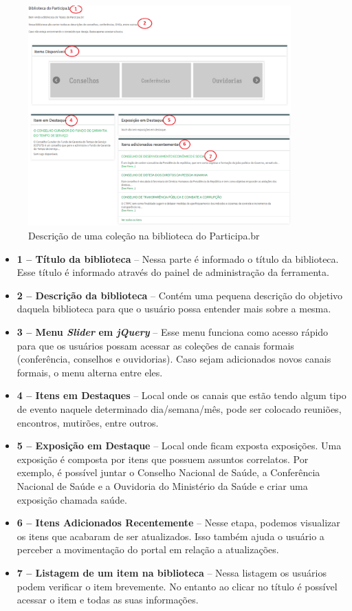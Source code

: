 \graphicspath{{figuras/prototipo/}}
\begin{figure}[H]
\centering
\includegraphics[width=0.9\textwidth]{pagina-inicial}
\caption{Descrição de uma coleção na biblioteca do Participa.br}
\label{fig:inicial_prototipo}
\end{figure}

\begin{itemize}
	\item \textbf{1 – Título da biblioteca} – Nessa parte é informado o título da biblioteca. Esse título é informado através do painel de administração da ferramenta.
	\item \textbf{2 – Descrição da biblioteca} – Contém uma pequena descrição do objetivo daquela biblioteca para que o usuário possa entender mais sobre a mesma.
	\item \textbf{3 – Menu \textit{Slider} em \textit{jQuery}} – Esse menu funciona como acesso rápido para que os usuários possam acessar as coleções de canais formais (conferência, conselhos e ouvidorias). Caso sejam adicionados novos canais formais, o menu alterna entre eles.
	\item \textbf{4 – Itens em Destaques} – Local onde os canais que estão tendo algum tipo de evento naquele determinado dia/semana/mês, pode ser colocado reuniões, encontros, mutirões, entre outros.
	\item \textbf{5 – Exposição em Destaque} – Local onde ficam exposta exposições. Uma exposição é composta por itens que possuem assuntos correlatos. Por exemplo, é possível juntar o Conselho Nacional de Saúde, a Conferência Nacional de Saúde e a Ouvidoria do Ministério da Saúde e criar uma exposição chamada saúde.	
	\item \textbf{6 – Itens Adicionados Recentemente} – Nesse etapa, podemos visualizar os itens que acabaram de ser atualizados. Isso também ajuda o usuário a perceber a movimentação do portal em relação a atualizações.
	\item \textbf{7 – Listagem de um item na biblioteca} – Nessa listagem os usuários podem verificar o item brevemente. No entanto ao clicar no título é possível acessar o item e todas as suas informações.
\end{itemize}

